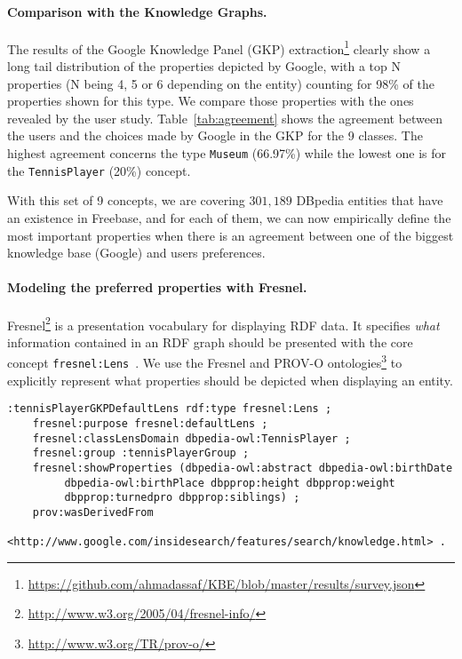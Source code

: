 \documentclass[runningheads,a4paper]{llncs}
\begin{document}
\paragraph{\textbf{Comparison with the Knowledge Graphs.}}
\label{sec:comparison}
The results of the Google Knowledge Panel (GKP) extraction\footnote{\url{https://github.com/ahmadassaf/KBE/blob/master/results/survey.json}} clearly show a long tail distribution of the properties depicted by Google, with a top N properties (N being 4, 5 or 6 depending on the entity) counting for 98\% of the properties shown for this type. We compare those properties with the ones revealed by the user study. Table~\ref{tab:agreement} shows the agreement between the users and the choices made by Google in the GKP for the 9 classes. The highest agreement concerns the type \texttt{Museum} (66.97\%) while the lowest one is for the \texttt{TennisPlayer} (20\%) concept.

\begin{table}[!htp]
\end{table}\normalsize
With this set of 9 concepts, we are covering $301,189$ DBpedia entities that have an existence in Freebase, and for each of them, we can now empirically define the most important properties when there is an agreement between one of the biggest knowledge base (Google) and users preferences.

\paragraph{\textbf{Modeling the preferred properties with Fresnel.}}
\label{sec:fresnel}
Fresnel\footnote{\url{http://www.w3.org/2005/04/fresnel-info/}} is a presentation vocabulary for displaying RDF data. It specifies \textit{what} information contained in an RDF graph should be presented with the core concept \texttt{fresnel:Lens}~\cite{pietriga2006}. We use the Fresnel and PROV-O ontologies\footnote{\url{http://www.w3.org/TR/prov-o/}} to explicitly represent what properties should be depicted when displaying an entity.
\scriptsize
\begin{verbatim}
:tennisPlayerGKPDefaultLens rdf:type fresnel:Lens ;
	fresnel:purpose fresnel:defaultLens ;
	fresnel:classLensDomain dbpedia-owl:TennisPlayer ;
	fresnel:group :tennisPlayerGroup ;
	fresnel:showProperties (dbpedia-owl:abstract dbpedia-owl:birthDate
		 dbpedia-owl:birthPlace dbpprop:height dbpprop:weight
		 dbpprop:turnedpro dbpprop:siblings) ;
	prov:wasDerivedFrom
	  <http://www.google.com/insidesearch/features/search/knowledge.html> .
\end{verbatim}
\normalsize
\end{document}
